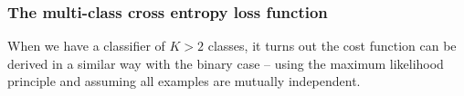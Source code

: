 \documentclass[a4paper]{article}
\begin{document}


\subsubsection{The multi-class cross entropy loss function}



When we have a classifier of $K > 2$ classes, it turns out the cost function can be derived in a similar way with the binary case -- using the maximum likelihood principle and assuming all examples are mutually independent.
\end{document}
